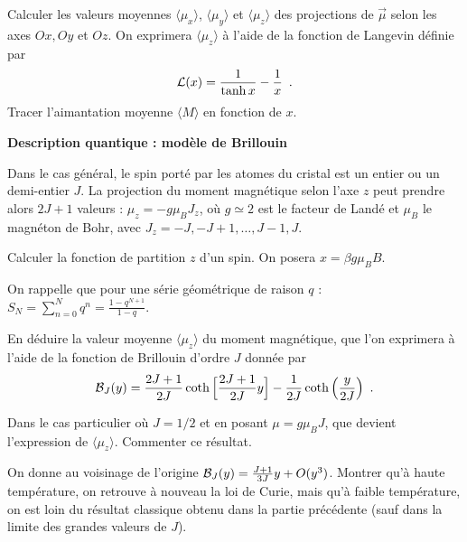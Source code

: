 \documentclass[utf8, 11pt]{feuille}
\begin{document}
\question
Calculer les valeurs moyennes $\langle \mu_x \rangle$, $\langle \mu_y \rangle$ et $\langle \mu_z \rangle$ des projections de $\overrightarrow{\mu}$ selon les axes $Ox, Oy$ et $Oz$. On exprimera $\langle \mu_z \rangle$ à l'aide de la fonction de Langevin définie par
$$
{\cal L}(x)=\frac{1}{\tanh x}-\frac{1}{x}\enspace.
$$
Tracer l'aimantation moyenne $\langle M \rangle$ en fonction de $x$.

\medskip

{\sffamily\bfseries{Description quantique : modèle de Brillouin}}

Dans le cas général, le spin porté par les atomes du cristal est un
entier ou un demi-entier $J$. La projection du moment magnétique selon
l'axe $z$ peut prendre alors $2J+1$ valeurs : $\mu_z= -g\mu_B J_z$, où
$g \simeq 2$ est le facteur de Landé et $\mu_B$ le magnéton de Bohr,
avec $J_z=-J, -J+1, \dots,J-1, J$.

\question
Calculer la fonction de partition $z$ d'un spin. On posera $x= \beta g \mu_B B$.

\noindent
On rappelle que pour une série géométrique de raison $q$ : $\displaystyle S_N=\sum_{n=0}^{N} q^n=\frac{1-q^{N+1}}{1-q}$.  

\question
En déduire la valeur moyenne $\langle \mu_z \rangle$ du moment magnétique, que l'on exprimera à l'aide de la fonction de Brillouin d'ordre $J$ donnée par
$$
{\cal B}_J(y)=\frac{2J+1}{2J} \coth \Big[\frac{2J+1}{2J}y\Big]-\frac{1}{2J}\coth \Big(\frac{y}{2J}\Big)\enspace.
$$

\question
Dans le cas particulier où $J=1/2$ et en posant $\mu = g\mu_B J$, que devient l'expression de $\langle \mu_z \rangle$. Commenter ce résultat. 

\question
On donne au voisinage de l'origine  ${\cal B}_J(y)= \frac{J+1}{3J} y+O(y^3)$. Montrer qu'à haute température, on retrouve à nouveau la loi de Curie, mais qu'à faible température, on est loin du résultat classique obtenu dans la partie précédente (sauf dans la limite des grandes valeurs de $J$).
\end{document}
